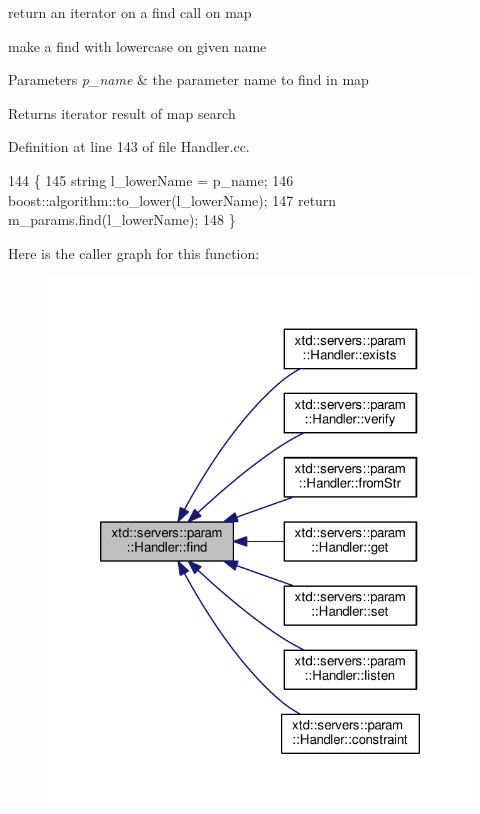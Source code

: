 return an iterator on a find call on map 

make a find with lowercase on given name


\begin{DoxyParams}{Parameters}
{\em p\-\_\-name} & the parameter name to find in map\\
\hline
\end{DoxyParams}
\begin{DoxyReturn}{Returns}
iterator result of map search 
\end{DoxyReturn}


Definition at line 143 of file Handler.\-cc.


\begin{DoxyCode}
144 \{
145   \textcolor{keywordtype}{string} l\_lowerName = p\_name;
146   boost::algorithm::to\_lower(l\_lowerName);
147   \textcolor{keywordflow}{return} m\_params.find(l\_lowerName);
148 \}
\end{DoxyCode}


Here is the caller graph for this function\-:
\nopagebreak
\begin{figure}[H]
\begin{center}
\leavevmode
\includegraphics[width=324pt]{classxtd_1_1servers_1_1param_1_1Handler_a66465c7a1ee0978f7558d55bfd8bd583_icgraph}
\end{center}
\end{figure}


